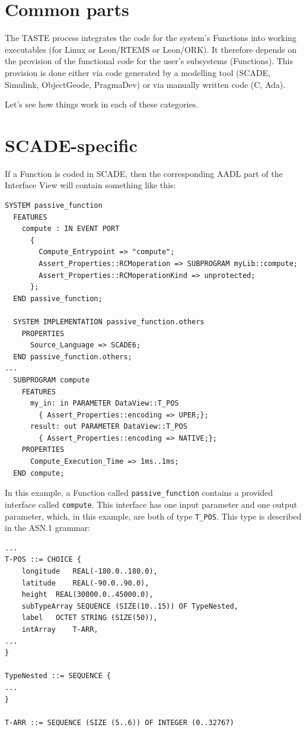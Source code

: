 \documentclass[11pt]{book}
\begin{document}
   \section{Common parts}
   The TASTE process integrates the code for the system's Functions into working 
   executables (for Linux or Leon/RTEMS or Leon/ORK). It therefore depends on 
   the provision of the functional code for the user's subsystems (Functions).
   This provision is done either via code generated by a modelling tool (SCADE,
   Simulink, ObjectGeode, PragmaDev) or via manually written code (C, Ada).

   Let's see how things work in each of these categories.
   \section{SCADE-specific}
   If a Function is coded in SCADE, then the corresponding AADL part of the Interface
   View will contain something like this:
\begin{lstlisting}[language=aadl]
  SYSTEM passive_function
  FEATURES
    compute : IN EVENT PORT
      {
        Compute_Entrypoint => "compute";
        Assert_Properties::RCMoperation => SUBPROGRAM myLib::compute;
        Assert_Properties::RCMoperationKind => unprotected;
      };
  END passive_function;
  
  SYSTEM IMPLEMENTATION passive_function.others
    PROPERTIES
      Source_Language => SCADE6;
  END passive_function.others;
...
  SUBPROGRAM compute
    FEATURES
      my_in: in PARAMETER DataView::T_POS
        { Assert_Properties::encoding => UPER;};
      result: out PARAMETER DataView::T_POS
        { Assert_Properties::encoding => NATIVE;};
    PROPERTIES
      Compute_Execution_Time => 1ms..1ms;
  END compute;
\end{lstlisting}
 
In this example, a Function called {\tt passive\_function} contains a provided interface
called {\tt compute}. This interface has one input parameter and one output parameter,
which, in this example, are both of type {\tt T\_POS}. This type is described in the 
ASN.1 grammar:

\begin{lstlisting}[language=aadl]
...
T-POS ::= CHOICE {
    longitude	REAL(-180.0..180.0),
    latitude	REAL(-90.0..90.0),
    height	REAL(30000.0..45000.0),
    subTypeArray SEQUENCE (SIZE(10..15)) OF TypeNested,
    label	OCTET STRING (SIZE(50)),
    intArray	T-ARR,
...    
}

TypeNested ::= SEQUENCE {
...
}

T-ARR ::= SEQUENCE (SIZE (5..6)) OF INTEGER (0..32767)

\end{lstlisting}
\end{document}
